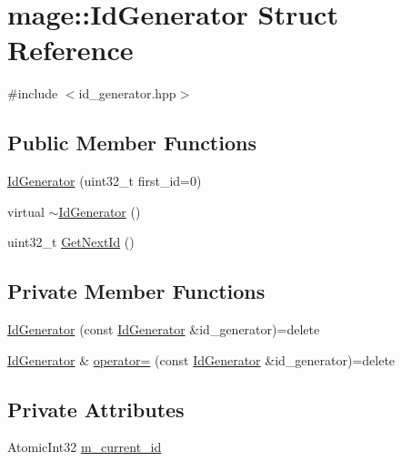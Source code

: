 \hypertarget{structmage_1_1_id_generator}{}\section{mage\+:\+:Id\+Generator Struct Reference}
\label{structmage_1_1_id_generator}


{\ttfamily \#include $<$id\+\_\+generator.\+hpp$>$}

\subsection*{Public Member Functions}
\begin{DoxyCompactItemize}
\item 
\hyperlink{structmage_1_1_id_generator_aede1dd978436b3e108646896666e177e}{Id\+Generator} (uint32\+\_\+t first\+\_\+id=0)
\item 
virtual \hyperlink{structmage_1_1_id_generator_aea2ded07fd7b34ff43150fe6e6f4882a}{$\sim$\+Id\+Generator} ()
\item 
uint32\+\_\+t \hyperlink{structmage_1_1_id_generator_a4c6252edb5d33c68603893f2a03ad25d}{Get\+Next\+Id} ()
\end{DoxyCompactItemize}
\subsection*{Private Member Functions}
\begin{DoxyCompactItemize}
\item 
\hyperlink{structmage_1_1_id_generator_a6f502d2cd8b63e7c76f31834b028a11d}{Id\+Generator} (const \hyperlink{structmage_1_1_id_generator}{Id\+Generator} \&id\+\_\+generator)=delete
\item 
\hyperlink{structmage_1_1_id_generator}{Id\+Generator} \& \hyperlink{structmage_1_1_id_generator_a370c8289f38a534006e8b9ca7ec78026}{operator=} (const \hyperlink{structmage_1_1_id_generator}{Id\+Generator} \&id\+\_\+generator)=delete
\end{DoxyCompactItemize}
\subsection*{Private Attributes}
\begin{DoxyCompactItemize}
\item 
Atomic\+Int32 \hyperlink{structmage_1_1_id_generator_ab094c8e57444d4fa02d5f3c2a5ea25f3}{m\+\_\+current\+\_\+id}
\end{DoxyCompactItemize}


